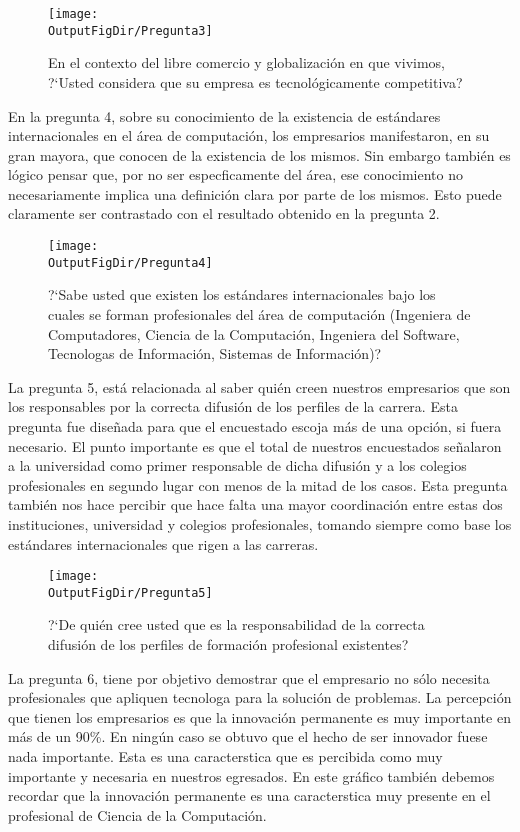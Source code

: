 \begin{figure}[!h]
	\centering
	\texttt{[image: \\OutputFigDir/Pregunta3]}
	\label{fig:Preg3}
	\caption{En el contexto del libre comercio y globalización en que vivimos, ?`Usted considera que su empresa es tecnológicamente competitiva?}
\end{figure}

En la pregunta 4, sobre su conocimiento de la existencia de estándares internacionales en el área de computación, los empresarios manifestaron, en su gran mayor­a, que conocen de la existencia de los mismos. Sin embargo también es lógico pensar que, por no ser espec­ficamente del área, ese conocimiento no necesariamente implica una definición clara por parte de los mismos. Esto puede claramente ser contrastado con el resultado obtenido en la pregunta 2.


\begin{figure}[!h]
	\centering
	\texttt{[image: \\OutputFigDir/Pregunta4]}
	\label{fig:Preg4}
	\caption{?`Sabe usted que existen los estándares internacionales bajo los cuales se forman profesionales del área de computación (Ingenier­a de Computadores, Ciencia de la Computación, Ingenier­a del Software, Tecnolog­as de Información, Sistemas de Información)?}
\end{figure}

La pregunta 5, está relacionada al saber quién creen nuestros empresarios que son los responsables por la correcta difusión de los perfiles de la carrera. Esta pregunta fue diseñada para que el encuestado escoja más de una opción, si fuera necesario. El punto importante es que el total de nuestros encuestados señalaron a la universidad como primer responsable de dicha difusión y a los colegios profesionales en segundo lugar con menos de la mitad de los casos. Esta pregunta también nos hace percibir que hace falta una mayor coordinación entre estas dos instituciones, universidad y colegios profesionales, tomando siempre como base los estándares internacionales que rigen a las carreras.

\begin{figure}[!h]
	\centering
	\texttt{[image: \\OutputFigDir/Pregunta5]}
	\label{fig:Preg5}
	\caption{?`De quién cree usted que es la responsabilidad de la correcta difusión de los perfiles de formación profesional existentes?}
\end{figure}

La pregunta 6, tiene por objetivo demostrar que el empresario no sólo necesita profesionales que apliquen tecnolog­a para la solución de problemas. La percepción que tienen los empresarios es que la innovación permanente es muy importante en más de un 90\%. En ningún caso se obtuvo que el hecho de ser innovador fuese nada importante. Esta es una caracter­stica que es percibida como muy importante y necesaria en nuestros egresados. En este gráfico también debemos recordar que la innovación permanente es una caracter­stica muy presente en el profesional de Ciencia de la Computación.

